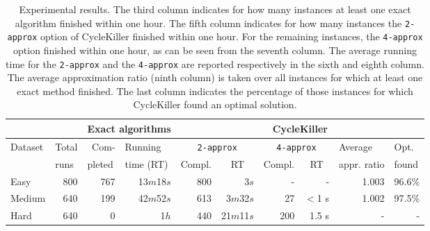 \begin{table}\label{table:experiments}
\begin{center}
\begin{tabular}{lr|r|r|r|r|r|r|r|r|}
\cline{3-10}
& & \multicolumn{2}{|c|}{Exact algorithms} & \multicolumn{6}{|c|}{\sc CycleKiller}\\
\hline

 \multicolumn{1}{|l|}{Dataset} & \multicolumn{1}{|l|}{Total} & Com- & \multicolumn{1}{|l|}{Running} &  \multicolumn{2}{|c|}{\texttt{2-approx}}  &  \multicolumn{2}{|c|}{\texttt{4-approx}}&  \multicolumn{1}{|l|}{Average} &  \multicolumn{1}{|l|}{Opt.}\\
 \cline{5-6}
   \cline{7-8}
 \multicolumn{1}{|l|}{} & \multicolumn{1}{|l|}{runs} & \multicolumn{1}{|l|}{pleted} &  \multicolumn{1}{|l|}{time (RT)} & \multicolumn{1}{|l|}{Compl.}  &  \multicolumn{1}{|c|}{RT}  & \multicolumn{1}{|l|}{Compl.}  &  \multicolumn{1}{|c|}{RT} & \multicolumn{1}{|c|}{appr. ratio} &  \multicolumn{1}{|l|}{found}\\
\hline
\multicolumn{1}{|l|}{Easy} & 800 & 767 & 13$m$18$s$ & 800 & 3$s$ & -  & -  & 1.003 & 96.6\% \\
\multicolumn{1}{|l|}{Medium} & 640 & 199 & 42$m$52$s$  & 613  & 3$m$32$s$ & 27 & $<$1 s & 1.002 & 97.5\%\\
\multicolumn{1}{|l|}{Hard} & 640 & 0 & 1$h$ & 440  &  21$m$11$s$ & 200 &1.5 s & - & -\\
\hline
\end{tabular}
\end{center}
\caption{Experimental results. The third column indicates for how many instances at least one exact algorithm finished within one hour. The fifth column indicates for how many instances the \texttt{2-approx} option of {\sc CycleKiller} finished within one hour. For the remaining instances, the \texttt{4-approx} option finished within one hour, as can be seen from the seventh column. The average running time for the \texttt{2-approx} and the \texttt{4-approx} are reported respectively in the sixth and eighth column. The average approximation ratio (ninth column) is taken over all instances for which at least one exact method finished.  The last column indicates the percentage of those instances for which {\sc CycleKiller} found an optimal solution.}
\end{table}
% 
% 
